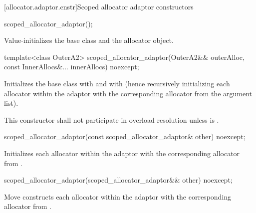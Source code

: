 [allocator.adaptor.cnstr]{Scoped allocator adaptor constructors}

%
\begin{itemdecl}
scoped_allocator_adaptor();
\end{itemdecl}

\begin{itemdescr}
\pnum
\effects Value-initializes the  base class and the  allocator
object.
\end{itemdescr}

%
\begin{itemdecl}
template<class OuterA2>
  scoped_allocator_adaptor(OuterA2&& outerAlloc, const InnerAllocs&... innerAllocs) noexcept;
\end{itemdecl}

\begin{itemdescr}
\pnum
\effects Initializes the  base class with
 and  with 
(hence recursively initializing each allocator within the adaptor with the corresponding
allocator from the argument list).

\pnum
\remarks This constructor shall not participate in overload resolution unless
 is .
\end{itemdescr}

%
\begin{itemdecl}
scoped_allocator_adaptor(const scoped_allocator_adaptor& other) noexcept;
\end{itemdecl}

\begin{itemdescr}
\pnum
\effects Initializes each allocator within the adaptor with the corresponding allocator
from .
\end{itemdescr}

%
\begin{itemdecl}
scoped_allocator_adaptor(scoped_allocator_adaptor&& other) noexcept;
\end{itemdecl}

\begin{itemdescr}
\pnum
\effects Move constructs each allocator within the adaptor with the corresponding allocator
from .
\end{itemdescr}

